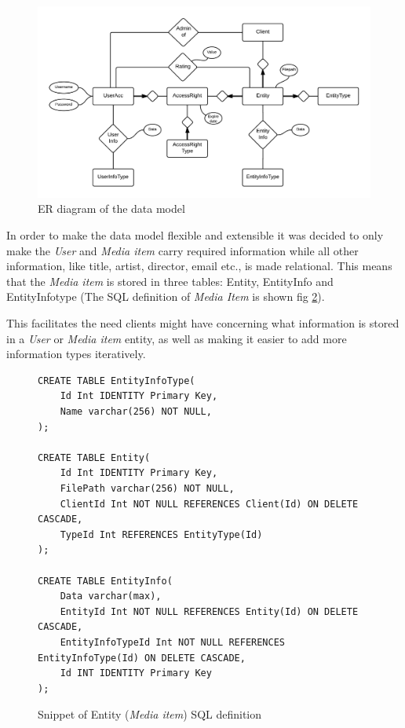 \documentclass[../report.tex]{subfiles}
\begin{document}
\begin{figure}[H]
\includegraphics[width=\linewidth]{ER.png}
\caption{ER diagram of the data model}
\label{fig:use case diagram}
\end{figure}

In order to make the data model flexible and extensible it was decided to only make the \textit{User} and \textit{Media item} carry required information while all other information, like title, artist, director, email etc., is made relational. This means that the \textit{Media item} is stored in three tables: Entity, EntityInfo and EntityInfotype (The SQL definition of \textit{Media Item} is shown fig \ref{datamodel}).

This facilitates the need clients might have concerning what information is stored in a \textit{User} or \textit{Media item} entity, as well as making it easier to add more information types iteratively.\\

\begin{figure}[H]
\begin{lstlisting}
CREATE TABLE EntityInfoType(
	Id Int IDENTITY Primary Key,
	Name varchar(256) NOT NULL,
);

CREATE TABLE Entity(
	Id Int IDENTITY Primary Key,
	FilePath varchar(256) NOT NULL,
	ClientId Int NOT NULL REFERENCES Client(Id) ON DELETE CASCADE,
	TypeId Int REFERENCES EntityType(Id)
);

CREATE TABLE EntityInfo(
	Data varchar(max),
	EntityId Int NOT NULL REFERENCES Entity(Id) ON DELETE CASCADE,
	EntityInfoTypeId Int NOT NULL REFERENCES EntityInfoType(Id) ON DELETE CASCADE,
	Id INT IDENTITY Primary Key
);
\end{lstlisting}
\caption{Snippet of Entity (\textit{Media item}) SQL definition}
\label{datamodel}
\end{figure}
\end{document}
